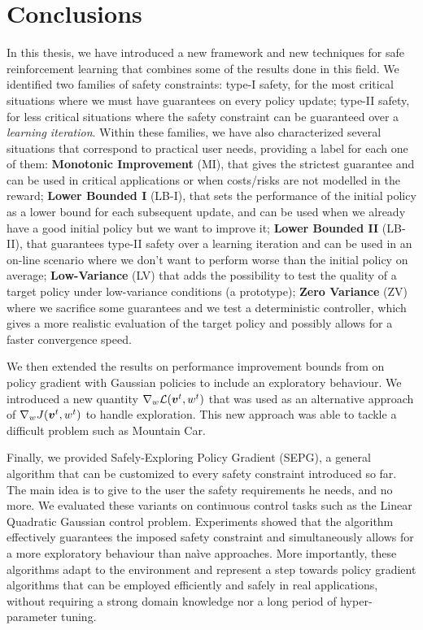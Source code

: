\chapter{Conclusions}
\label{ch:conclusion}

In this thesis, we have introduced a new framework and new techniques for safe reinforcement learning that combines some of the results done in this field. We identified two families of safety constraints: type-I safety, for the most critical situations where we must have guarantees on every policy update; type-II safety, for less critical situations where the safety constraint can be guaranteed over a \textit{learning iteration}. Within these families, we have also characterized several situations that correspond to practical user needs, providing a label for each one of them:
\textbf{Monotonic Improvement} (MI), that gives the strictest guarantee and can be used in critical applications or when costs/risks are not modelled in the reward; \textbf{Lower Bounded I} (LB-I), that sets the performance of the initial policy as a lower bound for each subsequent update, and can be used when we already have a good initial policy but we want to improve it; \textbf{Lower Bounded II} (LB-II), that guarantees type-II safety over a learning iteration and can be used in an on-line scenario where we don't want to perform worse than the initial policy on average; \textbf{Low-Variance} (LV) that adds the possibility to test the quality of a target policy under low-variance conditions (\eg a prototype); \textbf{Zero Variance} (ZV) where we sacrifice some guarantees and we test a deterministic controller, which gives a more realistic evaluation of the target policy and possibly allows for a faster convergence speed.



We then extended the results on performance improvement bounds from \cite{adaptive_batch,adaptive_step} on policy gradient with Gaussian policies to include an exploratory behaviour. We introduced a new quantity $\nabla_{w}\mathcal{L}(\boldsymbol{v}^t, w^t)$ that was used as an alternative approach of $\nabla_w J(\boldsymbol{v}^t, w^t)$ to handle exploration. This new approach was able to tackle a difficult problem such as Mountain Car.

Finally, we provided Safely-Exploring Policy Gradient (SEPG), a general algorithm that can be customized to every safety constraint introduced so far. The main idea is to give to the user the safety requirements he needs, and no more. We evaluated these variants on continuous control tasks such as the Linear Quadratic Gaussian control problem. Experiments showed that the algorithm effectively guarantees the imposed safety constraint and simultaneously allows for a more exploratory behaviour than na\`ive approaches. More importantly, these algorithms adapt to the environment and represent a step towards policy gradient algorithms that can be employed efficiently and safely in real applications, without requiring a strong domain knowledge nor a long period of hyper-parameter tuning. 

